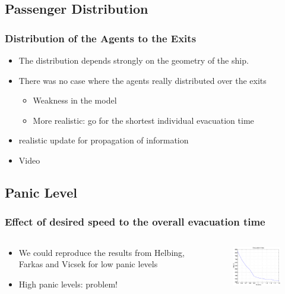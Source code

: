\documentclass{beamer}
\begin{document}
\subsection{Passenger Distribution}
\begin{frame}
	\frametitle{Distribution of the Agents to the Exits}
	\begin{itemize}
		\item The distribution depends strongly on the geometry of the ship.
		\item There was no case where the agents really distributed over the exits
		\begin{itemize}
			\item Weakness in the model
			\item More realistic: go for the shortest individual evacuation time
		\end{itemize}
		\item realistic update for propagation of information
		\item Video
	\end{itemize}
\end{frame}


\subsection{Panic Level}
\begin{frame}
	\frametitle{Effect of desired speed to the overall evacuation time}
	\begin{columns}
		\begin{column}{5cm}
			\begin{itemize}
				\item We could reproduce the results from Helbing, Farkas and Vicsek for low panic levels
				\item High panic levels: problem!
			\end{itemize}
		\end{column}
		\begin{column}{5cm}
			\begin{figure}
				\includegraphics[width=5cm]{images/evactimes1to11.eps}
			\end{figure}
		\end{column}
	\end{columns}
\end{frame}
\end{document}
